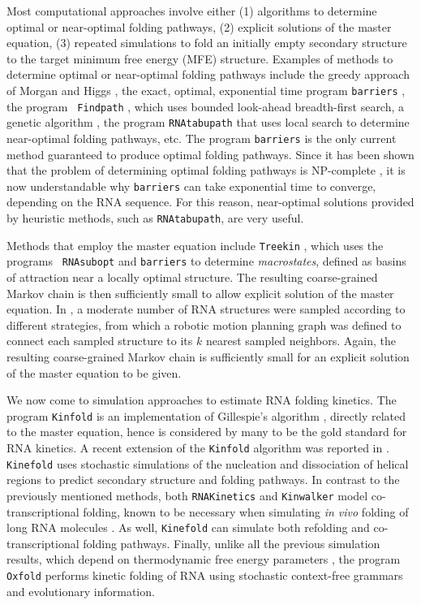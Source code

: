 Most computational approaches involve either (1) algorithms to
determine optimal or near-optimal folding pathways, (2) explicit
solutions of the master equation, (3) repeated simulations to fold an
initially empty secondary structure to the target minimum free energy
(MFE) structure. Examples of methods to determine optimal or
near-optimal folding pathways include the greedy approach of Morgan
and Higgs \cite{morganHiggsBarrier}, the exact, optimal, exponential
time program {\tt barriers} \cite{flammHofacker}, the program {\tt
Findpath} \cite{Flamm.r01}, which uses bounded look-ahead
breadth-first search, a genetic algorithm \cite{Shapiro.jmb01}, the
program {\tt RNAtabupath} that uses local search to determine
near-optimal folding pathways, etc. The program {\tt barriers}
\cite{flammHofacker} is the only current method guaranteed to
produce optimal folding pathways. Since it has been shown that
the problem of determining optimal folding pathways is
NP-complete \cite{Thachuk.psb10}, it is now understandable why
{\tt barriers} can take exponential time to converge, depending
on the RNA sequence. For this reason, near-optimal solutions
provided by heuristic methods, such as {\tt RNAtabupath}, are very useful.

Methods that employ the master equation include {\tt Treekin}
\cite{wolfingerStadler:kinetics}, which uses the programs {\tt
RNAsubopt} \cite{wuchtyFontanaHofackerSchuster} and {\tt barriers}
\cite{flammHofacker} to determine {\em macrostates}, defined as basins
of attraction near a locally optimal structure. The resulting
coarse-grained Markov chain is then sufficiently small to allow explicit
solution of the master equation. In \cite{Tang.jcb05}, a moderate
number of RNA structures were sampled according to different
strategies, from which a robotic motion planning graph was defined
to connect each sampled structure to its $k$ nearest sampled
neighbors. Again, the resulting coarse-grained Markov chain is
sufficiently small for an explicit solution of the master equation to
be given.

We now come to simulation approaches to estimate RNA folding kinetics.
The program {\tt Kinfold} \cite{flammPhD,flamm} is an implementation
of Gillespie's algorithm \cite{gillespieStochasticSimulation1},
directly related to the master equation, hence is considered by many
to be the gold standard for RNA kinetics. A recent extension of the
{\tt Kinfold} algorithm was reported in \cite{Aviram.amb12}. {\tt
Kinefold} \cite{Xayaphoummine.nar05} uses stochastic simulations of
the nucleation and dissociation of helical regions to predict
secondary structure and folding pathways. In contrast to the
previously mentioned methods, both {\tt RNAKinetics}
\cite{Danilova.jbcb06} and {\tt Kinwalker} \cite{Geis.jmb08} model
co-transcriptional folding, known to be necessary when simulating
{\em in vivo} folding of long RNA molecules \cite{Lai.r13}. As well,
{\tt Kinefold} can simulate both refolding and co-transcriptional folding
pathways. Finally, unlike all the previous simulation results, which
depend on thermodynamic free energy parameters \cite{Turner.nar10},
the program {\tt Oxfold} \cite{Anderson.b13} performs kinetic folding
of RNA using stochastic context-free grammars and evolutionary
information.


